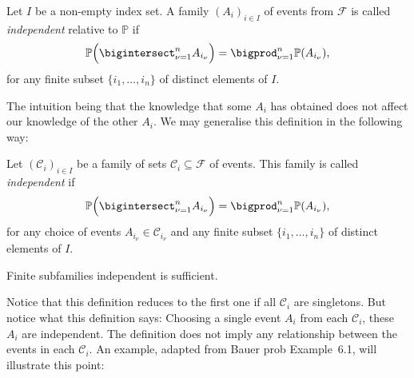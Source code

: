 \documentclass[article, a4paper, 11pt, oneside]{memoir}
\numberwithin{equation}{chapter}
\newcommand{\calF}{\mathcal{F}}
\newcommand{\calC}{\mathcal{C}}
\renewcommand{\P}{\mathbb{P}}
\begin{document}
\begin{definition}[Independence I]
    \label{def:independence-1}
    Let $I$ be a non-empty index set. A family $(A_i)_{i \in I}$ of events from $\calF$ is called \emph{independent} relative to $\P$ if
    \begin{equation*}
        \P \Bigl( \bigintersect_{\nu = 1}^n A_{i_\nu} \Bigr)
            = \bigprod_{\nu = 1}^n \P(A_{i_\nu}),
    \end{equation*}
    for any finite subset $\{ i_1, \ldots, i_n \}$ of distinct elements of $I$.
\end{definition}
%
The intuition being that the knowledge that some $A_i$ has obtained does not affect our knowledge of the other $A_i$. We may generalise this definition in the following way:

\begin{definition}[Independence II]
    \label{def:independence-2}
    Let $(\calC_i)_{i \in I}$ be a family of sets $\calC_i \subseteq \calF$ of events. This family is called \emph{independent} if
    \begin{equation*}
        \P \Bigl( \bigintersect_{\nu = 1}^n A_{i_\nu} \Bigr)
            = \bigprod_{\nu = 1}^n \P(A_{i_\nu}),
    \end{equation*}
    for any choice of events $A_{i_\nu} \in \calC_{i_\nu}$ and any finite subset $\{ i_1, \ldots, i_n \}$ of distinct elements of $I$.
\end{definition}

\begin{remark}
    \label{rem:finite-subfamilies-independent}
    Finite subfamilies independent is sufficient.
\end{remark}
%
Notice that this definition reduces to the first one if all $\calC_i$ are singletons. But notice what this definition says: Choosing a single event $A_i$ from each $\calC_i$, these $A_i$ are independent. The definition does not imply any relationship between the events in each $\calC_i$. An example, adapted from Bauer prob Example~6.1, will illustrate this point:

\newcommand{\powerset}[1]{2^{#1}}
\end{document}
